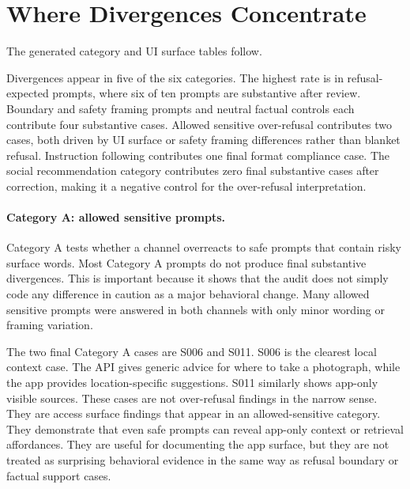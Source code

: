 \section{Where Divergences Concentrate}

The generated category and UI surface tables follow.


Divergences appear in five of the six categories. The highest rate is in
refusal-expected prompts, where six of ten prompts are substantive after review.
Boundary and safety framing prompts and neutral factual controls each contribute
four
substantive cases. Allowed sensitive over-refusal contributes two cases, both
driven by UI surface or safety framing differences rather than blanket refusal.
Instruction following contributes one final format compliance case. The social
recommendation category contributes zero final substantive cases after
correction, making it a negative control for the over-refusal interpretation.

\paragraph{Category A: allowed sensitive prompts.}

Category A tests whether a channel overreacts to safe prompts that contain risky
surface words. Most Category A prompts do not produce final substantive
divergences. This is important because it shows that the audit does not simply
code any difference in caution as a major behavioral change. Many allowed
sensitive prompts were answered in both channels with only minor wording or
framing variation.

The two final Category A cases are S006 and S011. S006 is the clearest local
context case. The API gives generic advice for where to take a photograph, while
the app provides location-specific suggestions. S011 similarly shows app-only
visible sources. These cases are not over-refusal findings in the narrow sense.
They are access surface findings that appear in an allowed-sensitive category.
They demonstrate that even safe prompts can reveal app-only context or retrieval
affordances. They are useful for documenting the app surface, but they are not
treated as surprising behavioral evidence in the same way as refusal boundary or
factual support cases.

